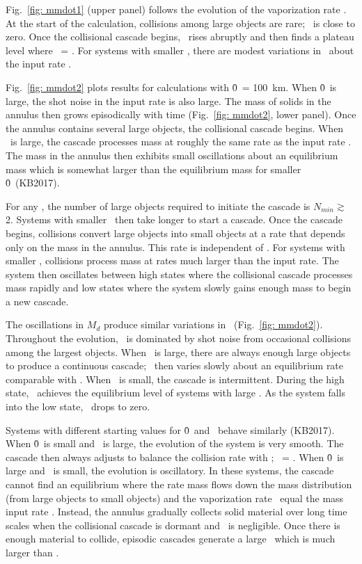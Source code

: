 \documentclass[12pt,preprint]{aastex}
\begin{document}
Fig.~\ref{fig: mmdot1} (upper panel) follows the evolution of the vaporization rate \mdotv. 
At the start of the calculation, collisions among large objects are rare; \mdotv\ is 
close to zero. Once the collisional cascade begins, \mdotv\ rises abruptly and then
finds a plateau level where \mdotv\ = \mdotz. For systems with smaller \mdotz, there 
are modest variations in \mdotv\ about the input rate \mdotz.

Fig.~\ref{fig: mmdot2} plots results for calculations with \r0\ = 100~km. When \r0\ is
large, the shot noise in the input rate is also large. The mass of solids in the annulus 
then grows episodically with time (Fig.~\ref{fig: mmdot2}, lower panel). Once the annulus 
contains several large objects, the collisional cascade begins. When \mdotz\ is large,
the cascade processes mass at roughly the same rate as the input rate \mdotz. The mass
in the annulus then exhibits small oscillations about an equilibrium mass which is 
somewhat larger than the equilibrium mass for smaller \r0\ (KB2017). 

For any \mdotz, the number of large objects required to initiate the cascade is 
$N_{min} \gtrsim$ 2.  Systems with smaller \mdotz\ then take longer to start a cascade.
Once the cascade begins, collisions convert large objects into small objects at a rate
that depends only on the mass in the annulus. This rate is independent of \mdotz. For 
systems with smaller \mdotz, collisions process mass at rates much larger than the 
input rate.  The system then oscillates between high states where the collisional 
cascade processes mass rapidly and low states where the system slowly gains enough mass 
to begin a new cascade.

The oscillations in $M_d$ produce similar variations in \mdotv\ (Fig.~\ref{fig: mmdot2}).
Throughout the evolution, \mdotv\ is dominated by shot noise from occasional collisions
among the largest objects. When \mdotz\ is large, there are always enough large objects to
produce a continuous cascade; \mdotv\ then varies slowly about an equilibrium rate comparable
with \mdotz. When \mdotz\ is small, the cascade is intermittent. During the high state, 
\mdotv\ achieves the equilibrium level of systems with large \mdotz. As the system falls into
the low state, \mdotv\ drops to zero.

Systems with different starting values for \r0\ and \mdotz\ behave similarly (KB2017). When
\r0\ is small and \mdotz\ is large, the evolution of the system is very smooth. The cascade
then always adjusts to balance the collision rate with \mdotz; \mdotv\ = \mdotz.
When \r0\ is large and \mdotz\ is small, the evolution is oscillatory. In these systems, 
the cascade cannot find an equilibrium where the rate mass flows down the mass distribution
(from large objects to small objects) and the vaporization rate \mdotv\ equal the mass input 
rate \mdotz. Instead, the annulus gradually collects solid material over long time scales when
the collisional cascade is dormant and \mdotv\ is negligible. Once there is enough material
to collide, episodic cascades generate a large \mdotv\ which is much larger than \mdotz. 
\end{document}
